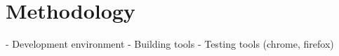 \chapter{Methodology}\label{cha:methodology}

- Development environment
- Building tools
- Testing tools (chrome, firefox)